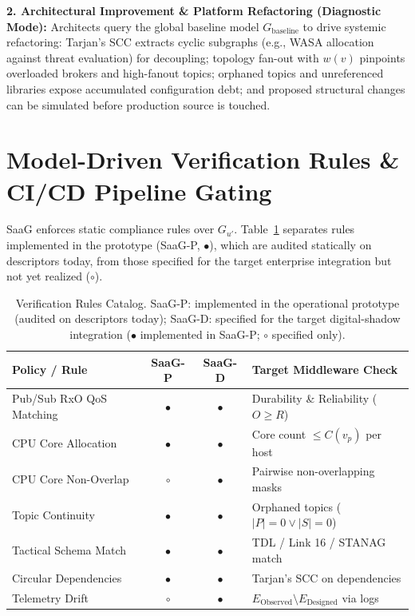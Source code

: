 \documentclass[sigconf,9pt]{acmart}
\begin{document}
\noindent\textbf{2. Architectural Improvement \& Platform Refactoring (Diagnostic Mode):} Architects query the global baseline model $G_{\text{baseline}}$ to drive systemic refactoring: Tarjan's SCC extracts cyclic subgraphs (e.g., WASA allocation against threat evaluation) for decoupling; topology fan-out with $w(v)$ pinpoints overloaded brokers and high-fanout topics; orphaned topics and unreferenced libraries expose accumulated configuration debt; and proposed structural changes can be simulated before production source is touched.

\section{Model-Driven Verification Rules \& CI/CD Pipeline Gating}

SaaG enforces static compliance rules over $G_{u'}$. Table~\ref{tab:rules} separates rules implemented in the prototype (SaaG-P, $\bullet$), which are audited statically on descriptors today, from those specified for the target enterprise integration but not yet realized ($\circ$).

\begin{table}[t]
\centering
\caption{Verification Rules Catalog. SaaG-P: implemented in the operational prototype (audited on descriptors today); SaaG-D: specified for the target digital-shadow integration ($\bullet$ implemented in SaaG-P; $\circ$ specified only).}
\label{tab:rules}
\small
\begin{tabularx}{\columnwidth}{l c c X}
\toprule
\textbf{Policy / Rule} & \textbf{SaaG-P} & \textbf{SaaG-D} & \textbf{Target Middleware Check} \\
\midrule
Pub/Sub RxO QoS Matching & $\bullet$ & $\bullet$ & Durability \& Reliability ($O \ge R$) \\
CPU Core Allocation & $\bullet$ & $\bullet$ & Core count $\le C(v_p)$ per host \\
CPU Core Non-Overlap & $\circ$ & $\bullet$ & Pairwise non-overlapping masks \\
Topic Continuity & $\bullet$ & $\bullet$ & Orphaned topics ($|P|=0 \lor |S|=0$) \\
Tactical Schema Match & $\bullet$ & $\bullet$ & TDL / Link 16 / STANAG match \\
Circular Dependencies & $\bullet$ & $\bullet$ & Tarjan's SCC on dependencies \\
Telemetry Drift & $\circ$ & $\bullet$ & $E_{\text{Observed}} \setminus E_{\text{Designed}}$ via logs \\
\bottomrule
\end{tabularx}
\end{table}
\end{document}
